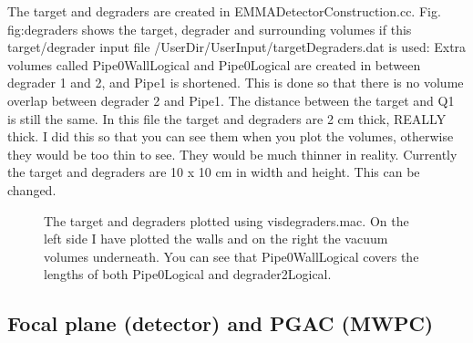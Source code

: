 \documentclass[letter,11pt]{article}
\begin{document}
The target and degraders are created in EMMADetectorConstruction.cc. Fig. {fig:degraders} shows the target, degrader and surrounding volumes if this target/degrader input file /UserDir/UserInput/targetDegraders.dat is used:
{\footnotesize }
Extra volumes called Pipe0WallLogical and Pipe0Logical are created in between degrader 1 and 2, and Pipe1 is shortened. This is done so that there is no volume overlap between degrader 2 and Pipe1. The distance between the target and Q1 is still the same. In this file the target and degraders are 2 cm thick, REALLY thick. I did this so that you can see them when you plot the volumes, otherwise they would be too thin to see. They would be much thinner in reality. Currently the target and degraders are 10 x 10 cm in width and height. This can be changed.

\begin{figure}
\centering
	\caption{The target and degraders plotted using visdegraders.mac. On the left side I have plotted the walls and on the right the vacuum volumes underneath. You can see that Pipe0WallLogical covers the lengths of both Pipe0Logical and degrader2Logical.}
	\label{fig:degraders}
\end{figure}

\newpage
\subsection{Focal plane (detector) and PGAC (MWPC)}
\end{document}
